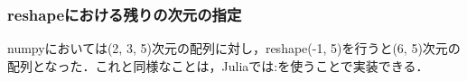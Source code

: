 \subsubsection{reshapeにおける残りの次元の指定}
numpyにおいては(2, 3, 5)次元の配列に対し，reshape(-1, 5)を行うと(6, 5)次元の配列となった．これと同様なことは，Juliaでは:を使うことで実装できる．
